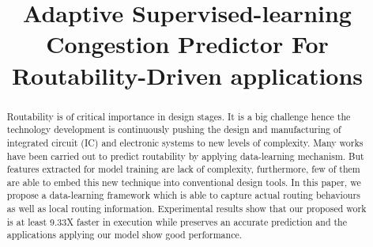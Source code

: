 \documentclass[conference]{IEEEtran}
\begin{document}
\title{Adaptive Supervised-learning Congestion Predictor For Routability-Driven applications\\
}


\maketitle

\begin{abstract}
Routability is of critical importance in design stages. It is a big challenge hence the technology development is continuously pushing the design and manufacturing of integrated circuit (IC) and electronic systems to new levels of complexity. Many works have been carried out to predict routability by applying data-learning mechanism. But features extracted for model training are lack of complexity, furthermore, few of them are able to embed this new technique into conventional design tools. In this paper, we propose a data-learning framework which is able to capture actual routing behaviours as well as local routing information. Experimental results show that our proposed work is at least 9.33X faster in execution while preserves an accurate prediction and the applications applying our model show good performance.
\end{abstract}
\end{document}
